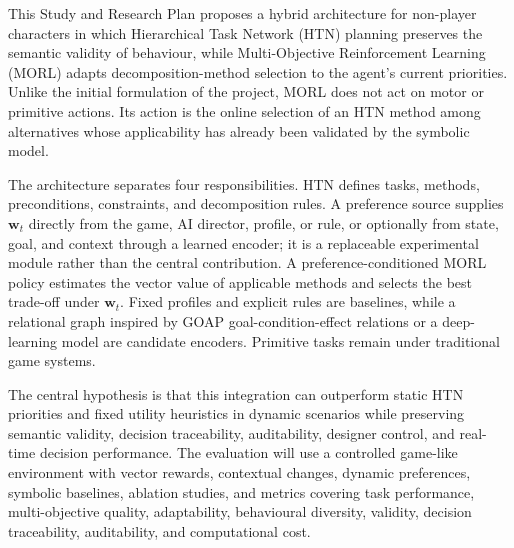 \documentclass[ppgc,pep,oneside,noabntcite]{infufrgs}
\begin{document}
\begin{translatedabstract}
This Study and Research Plan proposes a hybrid architecture for non-player
characters in which Hierarchical Task Network (HTN) planning preserves the
semantic validity of behaviour, while Multi-Objective Reinforcement Learning
(MORL) adapts decomposition-method selection to the agent's current
priorities.
Unlike the initial formulation of the project, MORL does not act on
motor or primitive actions.
Its action is the online selection of an HTN method among alternatives whose
applicability has already been validated by the symbolic model.

The architecture separates four responsibilities.
HTN defines tasks, methods, preconditions, constraints, and decomposition rules.
A preference source supplies $\mathbf{w}_t$ directly from the game, AI director,
profile, or rule, or optionally from state, goal, and context through a learned
encoder; it is a replaceable experimental module rather than the central contribution.
A preference-conditioned MORL policy estimates the vector value of applicable
methods and selects the best trade-off under $\mathbf{w}_t$.
Fixed profiles and explicit rules are baselines, while a relational graph
inspired by GOAP goal-condition-effect relations or a deep-learning model are
candidate encoders.
Primitive tasks  remain under traditional game systems.

The central hypothesis is that this integration can outperform static HTN
priorities and fixed utility heuristics in dynamic scenarios while preserving
semantic validity, decision traceability, auditability, designer control, and real-time decision
performance.
The evaluation will use a controlled game-like environment with vector rewards,
contextual changes, dynamic preferences, symbolic baselines, ablation studies,
and metrics covering task performance, multi-objective quality, adaptability,
behavioural diversity, validity, decision traceability, auditability, and computational cost.
\end{translatedabstract}

\tableofcontents












\end{document}
